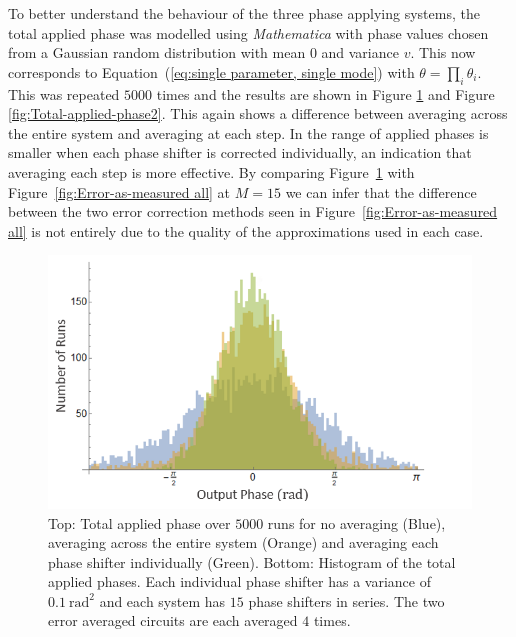 \documentclass[aps,pra,twocolumn,superscriptaddress,numerical,floatfix]{revtex4-1}
\begin{document}
To better understand the behaviour of the three phase applying systems, the total applied phase was modelled using \textit{Mathematica} with phase values chosen from a Gaussian random distribution with mean $0$ and variance $v$. This now corresponds to Equation~(\ref{eq:single parameter, single mode}) with $\theta=\prod_{i}\theta_{i}$. This was repeated $5000$ times and the results are shown in Figure \ref{fig:Total-applied-phase1} and Figure \ref{fig:Total-applied-phase2}. This again shows a difference between averaging across the entire system and averaging at each step. In the range of applied phases is smaller when each phase shifter is corrected individually, an indication that averaging each step is more effective. By comparing Figure~\ref{fig:Total-applied-phase1} with Figure~\ref{fig:Error-as-measured all} at $M=15$ we can infer that the difference between the two error correction methods seen in Figure~\ref{fig:Error-as-measured all} is not entirely due to the quality of the approximations used in each case.
%
\begin{figure}
\centerline{\includegraphics[width=\columnwidth]{totPhase1.png}}
\caption{Top: Total applied phase over $5000$ runs for no averaging (Blue), averaging across the entire system (Orange) and averaging each phase shifter individually (Green). Bottom: Histogram of the total applied phases. Each individual phase shifter has a variance of $0.1\ \textrm{rad}^{2}$ and each system has $15$ phase shifters in series. The two error averaged circuits are each averaged $4$ times. \label{fig:Total-applied-phase1}}
\end{figure}
%
\end{document}
